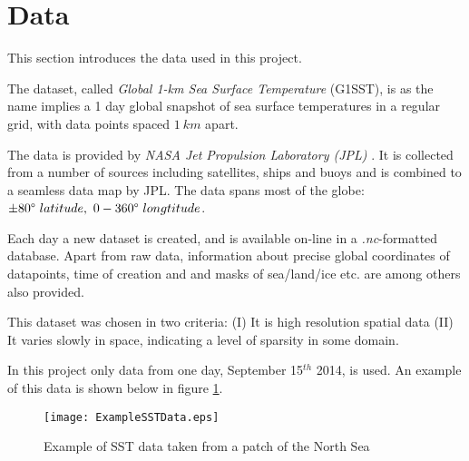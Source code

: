 \documentclass[Main]{subfiles}
\begin{document}
\section{Data} %
\label{sec:data}
	
	This section introduces the data used in this project.

	The dataset, called \emph{Global 1-km Sea Surface Temperature} (G1SST), is as the name implies a 1 day global snapshot of sea surface temperatures in a regular grid, with data points spaced $1\ km$ apart.

	The data is provided by \emph{NASA Jet Propulsion Laboratory (JPL)} \cite{G1SST:Online}.
	It is collected from a number of sources including satellites, ships and buoys and is combined to a seamless data map by JPL.
	The data spans most of the globe: $\pm 80\degree \ latitude,\ 0- 360\degree \ longtitude$.

	Each day a new dataset is created, and is available on-line in a \emph{.nc}-formatted database.
	Apart from raw data, information about precise global coordinates of datapoints, time of creation and and masks of sea/land/ice etc. are among others also provided.

	This dataset was chosen in two criteria: (I) It is high resolution spatial data (II) It varies slowly in space, indicating a level of sparsity in some domain.

	In this project only data from one day, September 15$^{th}$ 2014, is used. An example of this data is shown below in figure \ref{fig:ExampleSSTData}.
	
	\begin{figure}[H]
		\centering 
		\texttt{[image: ExampleSSTData.eps]}
		\caption{Example of SST data taken from a patch of the North Sea}
		\label{fig:ExampleSSTData}
	\end{figure}

\end{document}
